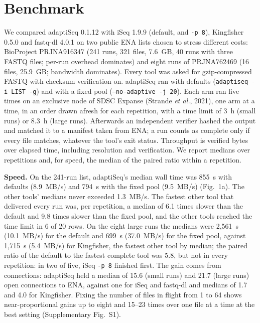 \documentclass[9pt,twocolumn,a4paper]{extarticle}
\newcommand{\code}[1]{{\small\texttt{#1}}}
\begin{document}
\section{Benchmark}
We compared adaptiSeq 0.1.12 with iSeq 1.9.9 (default, and \code{-p 8}), Kingfisher 0.5.0 and fastq-dl 4.0.1 on two public ENA lists chosen to stress different costs: BioProject PRJNA916347 (241 runs, 321 files, 7.6~GB, 40 runs with three FASTQ files; per-run overhead dominates) and eight runs of PRJNA762469 (16 files, 25.9~GB; bandwidth dominates). Every tool was asked for gzip-compressed FASTQ with checksum verification on. adaptiSeq ran with defaults (\code{adaptiseq -i LIST -g}) and with a fixed pool (\code{--no-adaptive -j 20}). Each arm ran five times on an exclusive node of SDSC Expanse (Strande {\it et al.}, 2021), one arm at a time, in an order drawn afresh for each repetition, with a time limit of 3~h (small runs) or 8.3~h (large runs). Afterwards an independent verifier hashed the output and matched it to a manifest taken from ENA; a run counts as complete only if every file matches, whatever the tool's exit status. Throughput is verified bytes over elapsed time, including resolution and verification. We report medians over repetitions and, for speed, the median of the paired ratio within a repetition.

\textbf{Speed.} On the 241-run list, adaptiSeq's median wall time was 855~s with defaults (8.9~MB/s) and 794~s with the fixed pool (9.5~MB/s) (Fig.~1a). The other tools' medians never exceeded 1.3~MB/s. The fastest other tool that delivered every run was, per repetition, a median of 6.1 times slower than the default and 9.8 times slower than the fixed pool, and the other tools reached the time limit in 6 of 20 rows. On the eight large runs the medians were 2,561~s (10.1~MB/s) for the default and 699~s (37.0~MB/s) for the fixed pool, against 1,715~s (5.4~MB/s) for Kingfisher, the fastest other tool by median; the paired ratio of the default to the fastest complete tool was 5.8, but not in every repetition: in two of five, iSeq \code{-p 8} finished first. The gain comes from connections: adaptiSeq held a median of 15.6 (small runs) and 21.7 (large runs) open connections to ENA, against one for iSeq and fastq-dl and medians of 1.7 and 4.0 for Kingfisher. Fixing the number of files in flight from 1 to 64 shows near-proportional gains up to eight and 15--23 times over one file at a time at the best setting (Supplementary Fig.~S1).
\end{document}
